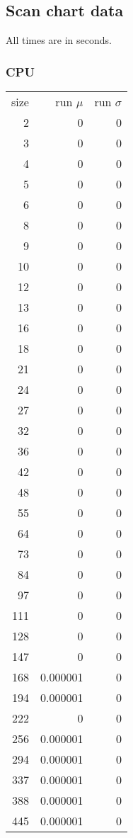 \subsection{Scan chart data}
\label{sec:scan_chart_data}

All times are in seconds.

\subsubsection{CPU}

\begin{tabular}{r r r}
size & run $\mu$ & run $\sigma$ \\
2 & 0 & 0 \\
3 & 0 & 0 \\
4 & 0 & 0 \\
5 & 0 & 0 \\
6 & 0 & 0 \\
8 & 0 & 0 \\
9 & 0 & 0 \\
10 & 0 & 0 \\
12 & 0 & 0 \\
13 & 0 & 0 \\
16 & 0 & 0 \\
18 & 0 & 0 \\
21 & 0 & 0 \\
24 & 0 & 0 \\
27 & 0 & 0 \\
32 & 0 & 0 \\
36 & 0 & 0 \\
42 & 0 & 0 \\
48 & 0 & 0 \\
55 & 0 & 0 \\
64 & 0 & 0 \\
73 & 0 & 0 \\
84 & 0 & 0 \\
97 & 0 & 0 \\
111 & 0 & 0 \\
128 & 0 & 0 \\
147 & 0 & 0 \\
168 & 0.000001 & 0 \\
194 & 0.000001 & 0 \\
222 & 0 & 0 \\
256 & 0.000001 & 0 \\
294 & 0.000001 & 0 \\
337 & 0.000001 & 0 \\
388 & 0.000001 & 0 \\
445 & 0.000001 & 0 \\

\end{tabular}
